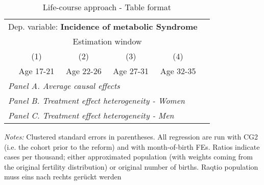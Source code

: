  \begin{table}[H] \centering \begin{threeparttable} \caption{Life-course approach - Table format} {\def\sym#1{\ifmmode^{#1}\else\(^{#1}\)\fi} \begin{tabular}{l*{5}{c}} \toprule \multicolumn{5}{l}{Dep. variable: \textbf{Incidence of metabolic Syndrome}} \\ & \multicolumn{4}{c}{Estimation window} \\ \cmidrule(lr){2-5}
            &\multicolumn{1}{c}{(1)}&\multicolumn{1}{c}{(2)}&\multicolumn{1}{c}{(3)}&\multicolumn{1}{c}{(4)}\\
            &\multicolumn{1}{c}{Age 17-21}&\multicolumn{1}{c}{Age 22-26}&\multicolumn{1}{c}{Age 27-31}&\multicolumn{1}{c}{Age 32-35}\\
\midrule
 \multicolumn{5}{l}{\emph{Panel A. Average causal effects}} \\      \midrule\multicolumn{5}{l}{\emph{Panel B. Treatment effect heterogeneity - Women}} \\      \midrule\multicolumn{5}{l}{\emph{Panel C. Treatment effect heterogeneity - Men}} \\      
\bottomrule \end{tabular} } \begin{tablenotes} \item \scriptsize \emph{Notes:} Clustered standard errors in parentheses. All regression are run with CG2 (i.e. the cohort prior to the reform) and with month-of-birth FEs. Ratios indicate cases per thousand; either approximated population (with weights coming from the original fertility distribution) or original number of births. Raqtio population muss eins nach rechts gerückt werden \end{tablenotes} \end{threeparttable} \end{table} 
